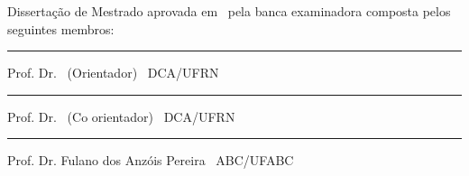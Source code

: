 \begin{titlepage}
\begin{center}

\LARGE

\textbf{\titulo}

\vfill

\Large

\textbf{\autor}

\end{center}

\vfill

\noindent
Dissertação de Mestrado aprovada em \dataaprovacao\ pela banca
examinadora composta pelos seguintes membros:

\begin{center}


\vspace{1.5cm}\rule{0.95\linewidth}{1pt}
\parbox{0.9\linewidth}{%
Prof. Dr. \orientador\ (Orientador) \dotfill\ DCA/UFRN}

\vspace{1.5cm}\rule{0.95\linewidth}{1pt}
\parbox{0.9\linewidth}{%
Prof. Dr. \coorientador\ (Co orientador) \dotfill\ DCA/UFRN}

\vspace{1.5cm}\rule{0.95\linewidth}{1pt}
\parbox{0.9\linewidth}{%
Prof. Dr. Fulano dos Anzóis Pereira \dotfill\ ABC/UFABC}

\end{center}
\end{titlepage}
